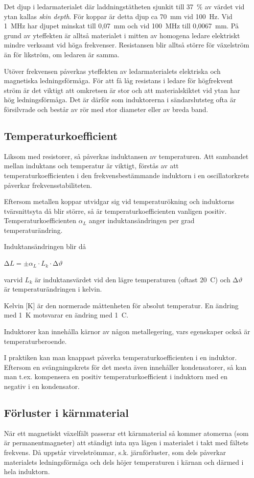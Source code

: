 Det djup i ledarmaterialet där laddningstätheten sjunkit till 37~\% av
värdet vid ytan kallas \emph{skin depth}. För koppar är detta djup ca 70~mm vid
100~Hz. Vid 1~MHz har djupet minskat till 0,07~mm och vid 100~MHz till
0,0067~mm. På grund av yteffekten är alltså materialet i mitten av homogena
ledare elektriskt mindre verksamt vid höga frekvenser. Resistansen blir alltså
större för växelström än för likström, om ledaren är samma.

Utöver frekvensen påverkas yteffekten av ledarmaterialets elektriska och
magnetiska ledningsförmåga. För att få låg resistans i ledare för högfrekvent
ström är det viktigt att omkretsen är stor och att materialskiktet vid ytan har
hög ledningsförmåga. Det är därför som induktorerna i sändarslutsteg ofta är
försilvrade och består av rör med stor diameter eller av breda band.

\subsection{Temperaturkoefficient}

Liksom med resistorer, så påverkas induktansen av temperaturen. Att sambandet
mellan induktans och temperatur är viktigt, förstås av att
temperaturkoefficienten i den frekvensbestämmande induktorn i en oscillatorkrets
påverkar frekvensstabiliteten.

Eftersom metallen koppar utvidgar sig vid temperaturökning och induktorns
tvärsnittsyta då blir större, så är temperaturkoefficienten vanligen positiv.
Temperaturkoefficienten \(\alpha_L\) anger induktansändringen per grad temperaturändring.

Induktansändringen blir då

\(∆L = \pm \alpha _L \cdot L_k \cdot ∆\vartheta\)

varvid \(L_k\) är induktansvärdet vid den lägre temperaturen (oftast 20~\degree C) och
\(∆\vartheta\) är temperaturändringen i kelvin.

Kelvin [K] är den normerade måttenheten för absolut temperatur. En ändring med
1~K motsvarar en ändring med 1~\degree C.

Induktorer kan innehålla kärnor av någon metallegering, vars egenskaper också är
temperaturberoende.

I praktiken kan man knappast påverka temperaturkoefficienten i en induktor.
Eftersom en svängningskrets för det mesta även innehåller kondensatorer, så kan
man t.ex. kompensera en positiv temperaturkoefficient i induktorn med en negativ
i en kondensator.

\subsection{Förluster i kärnmaterial}

När ett magnetiskt växelfält passerar ett kärnmaterial så kommer atomerna (som
är permanentmagneter) att ständigt inta nya lägen i materialet i takt med
fältets frekvens. Då uppstår virvelströmmar, s.k. järnförluster, som dels
påverkar materialets ledningsförmåga och dels höjer temperaturen i kärnan och
därmed i hela induktorn.

